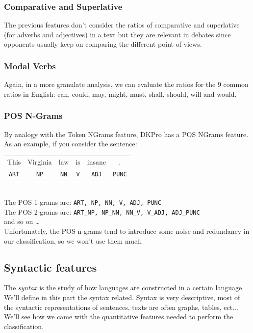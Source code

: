 \subsubsection{Comparative and Superlative}
The previous features don't consider the ratios of comparative and superlative (for adverbs and adjectives) in a text but they are relevant in debates since opponents usually keep on comparing the different point of views.

\subsubsection{Modal Verbs}
Again, in a more granulate analysis, we can evaluate the ratios for the 9 common ratios in English: can, could, may, might, must, shall, should, will and would.

\subsubsection{POS N-Grams}
By analogy with the Token NGrams feature, DKPro has a POS NGrams feature. As an example, if you consider the sentence:

\begin{table}[h]
\center
\begin{tabular}{cccccc}
This & Virginia & law & is & insane & .    \\
\texttt{ART}  & \texttt{NP}       & \texttt{NN}  & \texttt{V}  & \texttt{ADJ}    & \texttt{PUNC}
\end{tabular}
\end{table}\
\\
The POS 1-grams are: \texttt{ART, NP, NN, V, ADJ, PUNC}
\\
The POS 2-grams are: \texttt{ART\_NP, NP\_NN, NN\_V, V\_ADJ, ADJ\_PUNC}
\\
and so on \ldots
\\
Unfortunately, the POS n-grams tend to introduce some noise and redundancy in our classification, so we won't use them much.

\subsection{Syntactic features}
The \emph{syntax} is the study of how languages are constructed in a certain language. We'll define in this part the syntax related. Syntax is very descriptive, most of the syntactic representations of sentences, texts are often graphs, tables, ect... We'll see how we came with the quantitative features needed to perform the classification.

